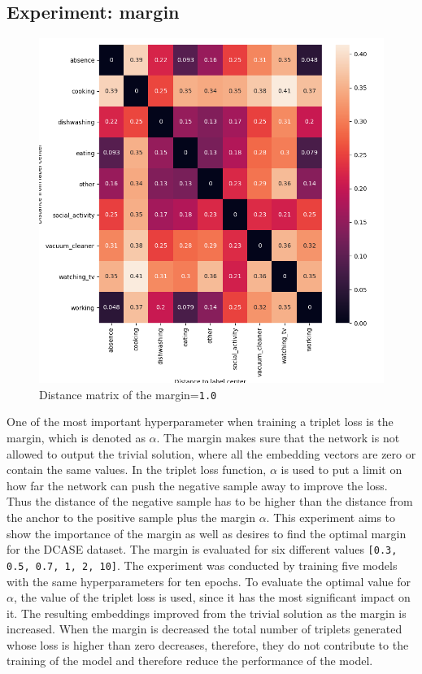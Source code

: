 \subsection{Experiment: margin}
\label{sub:Experiment-Margin}
\begin{figure}[hb]
\centering
    \includegraphics[width=0.5\linewidth]{study-doc/experiment_margin/assets/distance_mat_margin_1.png}
    \caption{Distance matrix of the margin=\texttt{1.0}}
    \label{fig:dist-margin-1}
\end{figure}
\noindent
One of the most important hyperparameter when training a triplet loss is the margin, which is denoted as $\alpha$. The margin makes sure that the network is not allowed to output the trivial solution, where all the embedding vectors are zero or contain the same values. In the triplet loss function, $\alpha$ is used to put a limit on how far the network can push the negative sample away to improve the loss. Thus the distance of the negative sample has to be higher than the distance from the anchor to the positive sample plus the margin $\alpha$. This experiment aims to show the importance of the margin as well as desires to find the optimal margin for the \gls{DCASE} dataset. The margin is evaluated for six different values \texttt{[0.3, 0.5, 0.7, 1, 2, 10]}.
\newline
\newline
The experiment was conducted by training five models with the same hyperparameters for ten epochs. To evaluate the optimal value for $\alpha$, the value of the triplet loss is used, since it has the most significant impact on it. The resulting embeddings improved from the trivial solution as the margin is increased. When the margin is decreased the total number of triplets generated whose loss is higher than zero decreases, therefore, they do not contribute to the training of the model and therefore reduce the performance of the model.
